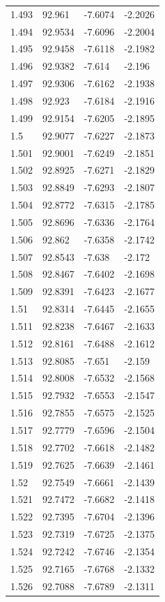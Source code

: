 \begin{tabular}{llll}
1.493 & 92.961 & -7.6074 & -2.2026 \\
1.494 & 92.9534 & -7.6096 & -2.2004 \\
1.495 & 92.9458 & -7.6118 & -2.1982 \\
1.496 & 92.9382 & -7.614 & -2.196 \\
1.497 & 92.9306 & -7.6162 & -2.1938 \\
1.498 & 92.923 & -7.6184 & -2.1916 \\
1.499 & 92.9154 & -7.6205 & -2.1895 \\
1.5 & 92.9077 & -7.6227 & -2.1873 \\
1.501 & 92.9001 & -7.6249 & -2.1851 \\
1.502 & 92.8925 & -7.6271 & -2.1829 \\
1.503 & 92.8849 & -7.6293 & -2.1807 \\
1.504 & 92.8772 & -7.6315 & -2.1785 \\
1.505 & 92.8696 & -7.6336 & -2.1764 \\
1.506 & 92.862 & -7.6358 & -2.1742 \\
1.507 & 92.8543 & -7.638 & -2.172 \\
1.508 & 92.8467 & -7.6402 & -2.1698 \\
1.509 & 92.8391 & -7.6423 & -2.1677 \\
1.51 & 92.8314 & -7.6445 & -2.1655 \\
1.511 & 92.8238 & -7.6467 & -2.1633 \\
1.512 & 92.8161 & -7.6488 & -2.1612 \\
1.513 & 92.8085 & -7.651 & -2.159 \\
1.514 & 92.8008 & -7.6532 & -2.1568 \\
1.515 & 92.7932 & -7.6553 & -2.1547 \\
1.516 & 92.7855 & -7.6575 & -2.1525 \\
1.517 & 92.7779 & -7.6596 & -2.1504 \\
1.518 & 92.7702 & -7.6618 & -2.1482 \\
1.519 & 92.7625 & -7.6639 & -2.1461 \\
1.52 & 92.7549 & -7.6661 & -2.1439 \\
1.521 & 92.7472 & -7.6682 & -2.1418 \\
1.522 & 92.7395 & -7.6704 & -2.1396 \\
1.523 & 92.7319 & -7.6725 & -2.1375 \\
1.524 & 92.7242 & -7.6746 & -2.1354 \\
1.525 & 92.7165 & -7.6768 & -2.1332 \\
1.526 & 92.7088 & -7.6789 & -2.1311 \\

\end{tabular}
